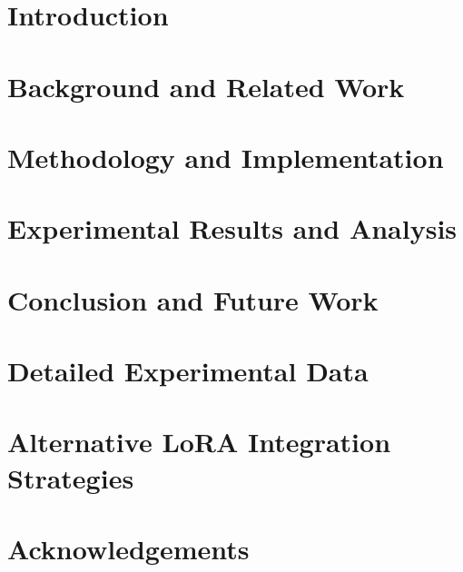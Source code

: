 \documentclass[12pt,a4paper,openright,twoside]{report}
\begin{document}
\chapter{Introduction}
\label{chap:intro}
\lhead[\fancyplain{}{\bfseries\thepage}]{\fancyplain{}{\bfseries\rightmark}}


\chapter{Background and Related Work}
\label{chap:background}
\lhead[\fancyplain{}{\bfseries\thepage}]{\fancyplain{}{\bfseries\rightmark}}


\chapter{Methodology and Implementation}
\label{chap:methodology}
\lhead[\fancyplain{}{\bfseries\thepage}]{\fancyplain{}{\bfseries\rightmark}}


\chapter{Experimental Results and Analysis}
\label{chap:results}
\lhead[\fancyplain{}{\bfseries\thepage}]{\fancyplain{}{\bfseries\rightmark}}


\chapter{Conclusion and Future Work}
\label{chap:conclusion}
\lhead[\fancyplain{}{\bfseries\thepage}]{\fancyplain{}{\bfseries\rightmark}}




\appendix
\chapter{Detailed Experimental Data}
\label{app:appendix1}


\chapter{Alternative LoRA Integration Strategies}
\label{app:appendix2}


\chapter*{Acknowledgements}
\end{document}
